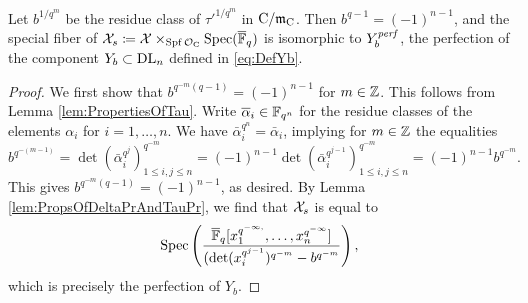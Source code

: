 \documentclass[../main.tex]{subfiles}
\begin{document}

\begin{prop}\label{prop:SpecialFiberOfAffinoidIsLusztig}
  Let $b^{1/q^m}$ be the residue class of $\tau'^{1/q^m}$ in ${\mathrm{C}}/\mathfrak{m}_{{\mathrm{C}}}$. 
  Then $b^{q-1} = (-1)^{n-1}$, and the special fiber of $\mathcal{X}_s \coloneq \mathcal{X}
  \times_{\operatorname{Spf} \mathcal{O}_{\mathrm{C}}} \operatorname{Spec} ({\overline {\mathbb{F}}_q})$ is isomorphic to $Y_b^{\mathit{perf}}$, the
  perfection of the component $Y_b \subset \mathrm{DL}_n$ defined in \eqref{eq:DefYb}.
\begin{proof}
  We first show that $b^{q^{-m}(q-1)} = (-1)^{n-1}$ for $m \in \mathbb{Z}$. 
  This follows from Lemma \ref{lem:PropertiesOfTau}. 
  Write $\overline \alpha_i \in \mathbb{F}_{q^n}$ for the residue classes of the 
  elements $\alpha_i$ for $i = 1, \dots, n$. We have $\bar \alpha_i^{q^n}
  = \bar \alpha_i$, implying for $m \in \mathbb{Z}$ the equalities
  \begin{equation*}
    b^{q^{-(m-1)}} = \det(\bar \alpha_i^{q^j})_{1 \leq i,j \leq n}^{q^{-m}} =
    (-1)^{n-1} \det (\bar \alpha_i^{q^{j-1}})_{1 \leq i,j \leq n}^{q^{-m}} =
    (-1)^{n-1} b^{q^{-m}}.
  \end{equation*}
  This gives $b^{q^{-m}(q-1)} = (-1)^{n-1}$, as desired.
  By Lemma \ref{lem:PropsOfDeltaPrAndTauPr}, we find that $\mathcal{X}_s$ is equal to
  \begin{equation*}
    \operatorname{Spec} \left( \frac{{\overline {\mathbb{F}}_q} [x_1^{q^{-\infty,}}, \dots,
    x_n^{q^{-\infty}}]}{(\det(x_i^{q^{j-1}})^{q^{-m}}- b^{q^{-m}}} \right),
  \end{equation*}
  which is precisely the perfection of $Y_b$.
\end{proof}
\end{prop}
\end{document}
